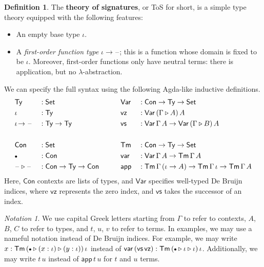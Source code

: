 \documentclass[12pt,a4paper,twoside,openany]{book}
\theoremstyle{remark}
\newtheorem{notation}{Notation}
\theoremstyle{definition}
\newtheorem{mydefinition}{Definition}
\theoremstyle{theorem}
\newcommand{\ms}[1]{\mathsf{#1}}
\newcommand{\Con}{\mathsf{Con}}
\newcommand{\Tm}{\mathsf{Tm}}
\newcommand{\Ty}{\mathsf{Ty}}
\newcommand{\blank}{\mathord{\hspace{1pt}\text{--}\hspace{1pt}}}
\newcommand{\Set}{\mathsf{Set}}
\newcommand{\ext}{\triangleright}
\newcommand{\emptycon}{\scaleobj{.75}\bullet}
\newcommand{\Var}{\ms{Var}}
\newcommand{\var}{\ms{var}}
\newcommand{\app}{\ms{app}}
\newcommand{\vz}{\ms{vz}}
\newcommand{\vs}{\ms{vs}}
\begin{document}
\begin{mydefinition}
The \textbf{theory of signatures}, or ToS for short, is a simple type theory
equipped with the following features:
  \begin{itemize}
    \item An empty base type $\iota$.
    \item A \emph{first-order function type} $\iota\!\to\!\blank$; this is a
      function whose domain is fixed to be $\iota$. Moreover, first-order functions only
      have neutral terms: there is application, but no $\lambda$-abstraction.
  \end{itemize}
\end{mydefinition}

We can specify the full syntax using the following Agda-like inductive definitions.
\begin{alignat*}{4}
  & \Ty              &&: \Set           && \Var &&: \Con \to \Ty \to \Set \\
  & \iota            &&: \Ty            && \vz  &&: \Var\,(\Gamma \ext A)\,A \\
  & \iota\!\to\blank &&: \Ty \to \Ty    && \vs  &&: \Var\,\Gamma\,A \to \Var\,(\Gamma \ext B)\,A\\
  & && && &&\\
  & \Con             &&: \Set           && \Tm  &&: \Con \to \Ty \to \Set \\
  & \emptycon        &&: \Con           && \var &&: \Var\,\Gamma\,A \to \Tm\,\Gamma\,A \\
  & \blank\ext\blank &&: \Con \to \Ty \to \Con \hspace{2em} && \app &&: \Tm\,\Gamma\,(\iota\to A) \to \Tm\,\Gamma\,\iota
                                                           \to \Tm\,\Gamma\,A
\end{alignat*}
Here, $\Con$ contexts are lists of types, and $\Var$ specifies well-typed De Bruijn indices, where
$\vz$ represents the zero index, and $\vs$ takes the successor of an index.

\begin{notation} We use capital Greek letters starting from $\Gamma$ to refer to contexts, $A$, $B$, $C$ to
refer to types, and $t$, $u$, $v$ to refer to terms. In examples, we may use a
nameful notation instead of De Bruijn indices. For example, we may write $x :
\Tm\,(\emptycon \ext (x : \iota) \ext (y : \iota))\,\iota$ instead of $\var\,(\vs\,\vz)
: \Tm\,(\emptycon \ext \iota \ext \iota)\,\iota$. Additionally, we may write
$t\,u$ instead of $\app\,t\,u$ for $t$ and $u$ terms.
\end{notation}
\end{document}
